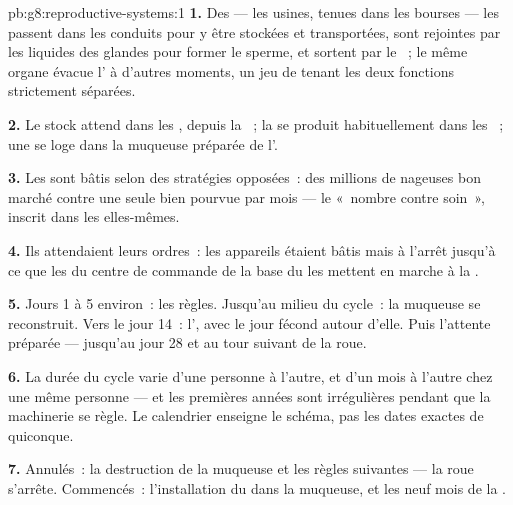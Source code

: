 \begin{solution}{pb:g8:reproductive-systems:1}
\textbf{1.} Des  --- les usines, tenues dans les bourses
--- les  passent dans les conduits pour y être
stockées et transportées, sont rejointes par les liquides des
glandes pour former le sperme, et sortent par le ~; le même
organe évacue l' à d'autres moments, un jeu de  tenant
les deux fonctions strictement séparées.

\textbf{2.} Le stock attend dans les , depuis la ~;
la  se produit habituellement dans les ~; une
 se loge dans la muqueuse préparée de l'.

\textbf{3.} Les  sont bâtis selon des stratégies opposées~:
des millions de nageuses bon marché contre une seule 
bien pourvue par mois --- le «~nombre contre soin~», inscrit dans
les  elles-mêmes.

\textbf{4.} Ils attendaient leurs ordres~: les appareils étaient
bâtis mais à l'arrêt jusqu'à ce que les  du centre de
commande de la base du  les mettent en marche à la .

\textbf{5.} Jours 1 à 5 environ~: les règles. Jusqu'au milieu du
cycle~: la muqueuse se reconstruit. Vers le jour 14~: l',
avec le jour fécond autour d'elle. Puis l'attente préparée ---
jusqu'au jour 28 et au tour suivant de la roue.

\textbf{6.} La durée du cycle varie d'une personne à l'autre, et
d'un mois à l'autre chez une même personne --- et les premières
années sont irrégulières pendant que la machinerie se règle. Le
calendrier enseigne le schéma, pas les dates exactes de quiconque.

\textbf{7.} Annulés~: la destruction de la muqueuse et les règles
suivantes --- la roue s'arrête. Commencés~: l'installation du 
dans la muqueuse, et les neuf mois de la .


\end{solution}

